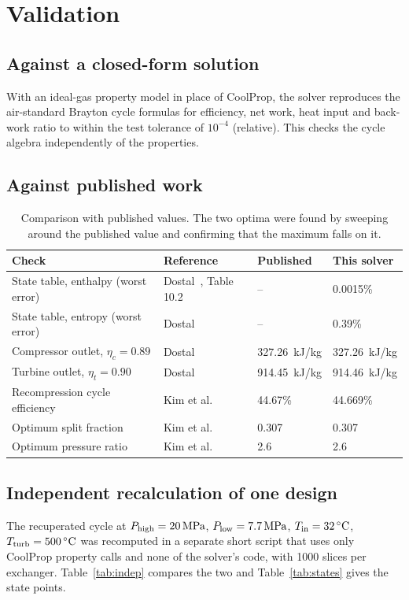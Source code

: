 \section{Validation}\label{app:validation}

\subsection{Against a closed-form solution}
With an ideal-gas property model in place of CoolProp, the solver reproduces the air-standard Brayton cycle formulas for efficiency, net work, heat input and back-work ratio to within the test tolerance of $10^{-4}$ (relative). This checks the cycle algebra independently of the \cotwo{} properties.


\subsection{Against published \scotwo{} work}
\begin{table}[!htbp]\centering\small
\begin{tabular}{llll}
\toprule
Check & Reference & Published & This solver\\
\midrule
State table, enthalpy (worst error) & Dostal~\cite{dostal}, Table 10.2 & -- & 0.0015\%\\
State table, entropy (worst error) & Dostal & -- & 0.39\%\\
Compressor outlet, $\eta_c = 0.89$ & Dostal & \SI{327.26}{kJ/kg} & \SI{327.26}{kJ/kg}\\
Turbine outlet, $\eta_t = 0.90$ & Dostal & \SI{914.45}{kJ/kg} & \SI{914.46}{kJ/kg}\\
Recompression cycle efficiency & Kim et al.~\cite{kim} & 44.67\% & 44.669\%\\
Optimum split fraction & Kim et al. & 0.307 & 0.307\\
Optimum pressure ratio & Kim et al. & 2.6 & 2.6\\
\bottomrule
\end{tabular}
\caption{Comparison with published values. The two optima were found by sweeping around the published value and confirming that the maximum falls on it.}
\end{table}


\subsection{Independent recalculation of one design}
The recuperated cycle at $P_\mathrm{high} = \SI{20}{MPa}$, $P_\mathrm{low} = \SI{7.7}{MPa}$, $T_\mathrm{in} = \SI{32}{\celsius}$, $T_\mathrm{turb} = \SI{500}{\celsius}$ was recomputed in a separate short script that uses only CoolProp property calls and none of the solver's code, with 1000 slices per exchanger. Table~\ref{tab:indep} compares the two and Table~\ref{tab:states} gives the state points.

